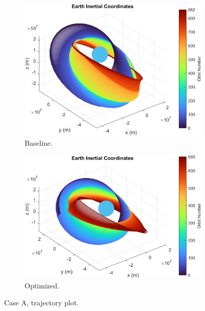 \begin{figure}[H]
    \centering
    \begin{subfigure}[t]{0.49\textwidth}
        \includegraphics[width=\textwidth]{figures/benchmark_transfer/trajectory_plot.png}
        \caption{Baseline.}
        \label{fig:results_traj_optim_a_1}
    \end{subfigure}
    \begin{subfigure}[t]{0.49\textwidth}
        \includegraphics[width=\textwidth]{figures/benchmark_optim/trajectory_plot.png}
        \caption{Optimized.}
        \label{fig:results_traj_optim_a_2}
    \end{subfigure}
    \caption{Case A, trajectory plot.}
    \label{fig:results_traj_optim_a}
\end{figure}


